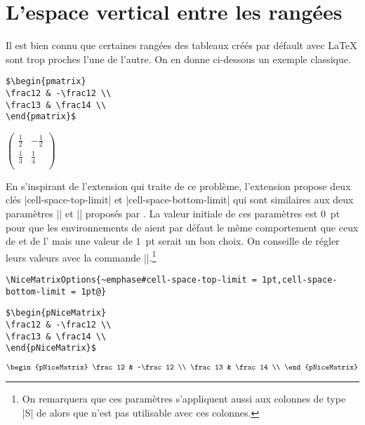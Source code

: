 \documentclass[dvipsnames]{article}%
\begin{document}
\section{L'espace vertical entre les rangées}

Il est bien connu que certaines rangées des tableaux créés par défault avec
LaTeX sont trop proches l'une de l'autre. On en donne ci-dessous un exemple
classique.

\medskip
\begin{BVerbatim}[baseline=c,boxwidth=9cm]
$\begin{pmatrix}
\frac12 & -\frac12 \\
\frac13 & \frac14 \\
\end{pmatrix}$
\end{BVerbatim}
$\begin{pmatrix}
\frac12 & -\frac12 \\
\frac13 & \frac14 \\
\end{pmatrix}$

\bigskip
En s'inspirant de l'extension  qui traite de ce problème,
l'extension  propose deux clés |cell-space-top-limit| et
|cell-space-bottom-limit| qui sont similaires aux deux paramètres
|\cellspacetoplimit| et |\cellspacebottomlimit| proposés par . La
valeur initiale de ces paramètres est $0$~pt pour que les environnements de
 aient par défaut le même comportement que ceux de 
et de l' mais une valeur de $1$~pt serait un bon choix. On
conseille de régler leurs valeurs avec la commande
|\NiceMatrixOptions|.\footnote{On remarquera que ces paramètres s'appliquent
  aussi aux colonnes de type |S| de  alors que 
  n'est pas utilisable avec ces colonnes.}

\medskip
\begin{Verbatim}
\NiceMatrixOptions{~emphase#cell-space-top-limit = 1pt,cell-space-bottom-limit = 1pt@}
\end{Verbatim}

\begin{BVerbatim}[baseline=c,boxwidth=9cm]
$\begin{pNiceMatrix}
\frac12 & -\frac12 \\
\frac13 & \frac14 \\
\end{pNiceMatrix}$
\end{BVerbatim}
\begin{scope}
$\begin{pNiceMatrix}
\frac12 & -\frac12 \\
\frac13 & \frac14 \\
\end{pNiceMatrix}$
\end{scope}
\end{document}
